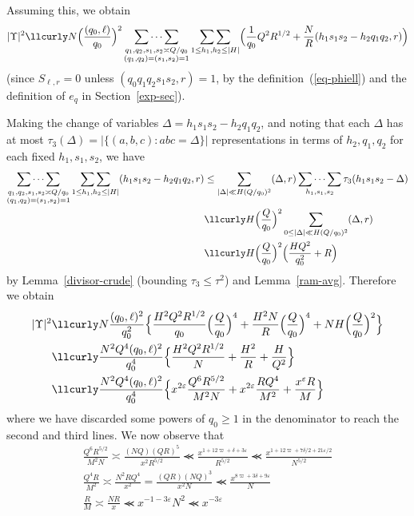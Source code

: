 \documentclass[12pt,a4paper,reqno]{amsart}
\numberwithin{equation}{section}
\theoremstyle{plain}
\theoremstyle{definition}
\newcommand\eps{\varepsilon}
\newcommand\sumsum{\mathop{\sum\sum}\limits}
\newcommand\multsum{\mathop{\sum\cdots\sum}\limits}
\renewcommand{\sim}{\asymp}
\renewcommand{\lessapprox}{\llcurly}
\begin{document}
Assuming this, we obtain
$$
|\Upsilon|^2\lessapprox N\Bigl(\frac{(q_0,\ell)}{q_0}\Bigr)^2
\multsum_{\substack{q_1,q_2,s_1,s_2\sim Q/q_0\\
    (q_1,q_2)=(s_1,s_2)=1 }} \sumsum_{1\leq h_1,h_2\leq |H|}
\Bigl(\frac{1}{q_0}Q^2 R^{1/2} +
\frac{N}{R}(h_1s_1s_2-h_2q_1q_2,r)\Bigr)
$$
(since $S_{\ell,r}=0$ unless $(q_0q_1q_2s_1s_2,r)=1$, by the
definition~(\ref{eq-phiell}) and the definition of $e_q$ in
Section~\ref{exp-sec}).
\par
Making the change of variables $\Delta = h_1 s_1 s_2 - h_2 q_1 q_2$, and noting that each $\Delta$ has at most $\tau_3(\Delta) = |\{ (a,b,c): abc = \Delta \}|$ representations in terms of $h_2,q_1,q_2$ for each fixed $h_1,s_1,s_2$, we have
\begin{align*}
  \multsum_{\substack{q_1,q_2,s_1,s_2\sim Q/q_0\\
      (q_1,q_2)=(s_1,s_2)=1 }} \sumsum_{1\leq h_1,h_2\leq |H|}
  (h_1s_1s_2-h_2q_1q_2,r) &\leq \sum_{|\Delta|\ll
    H(Q/q_0)^2}(\Delta,r) \multsum_{h_1,s_1,s_2}
  \tau_3(h_1s_1s_2-\Delta)\\
  &\lessapprox H\Bigl(\frac{Q}{q_0}\Bigr)^2\sum_{0\leq |\Delta|\ll
    H(Q/q_0)^2}(\Delta,r)\\
&\lessapprox H\Bigl(\frac{Q}{q_0}\Bigr)^2\Bigl(\frac{HQ^2}{q_0^2}+R\Bigr)
\end{align*}
by Lemma~\ref{divisor-crude} (bounding $\tau_3 \leq \tau^2$) and
Lemma~\ref{ram-avg}. Therefore we obtain
\begin{align}
  |\Upsilon|^2&\lessapprox N\frac{(q_0,\ell)^2}{q_0^2}\Bigl\{
  \frac{H^2Q^2R^{1/2}}{q_0}\Bigl(\frac{Q}{q_0}\Bigr)^4
  +\frac{H^2N}{R}\Bigl(\frac{Q}{q_0}\Bigr)^4+
  NH\Bigl(\frac{Q}{q_0}\Bigr)^2
  \Bigr\}\nonumber\\
  &\lessapprox \frac{N^2Q^4(q_0,\ell)^2}{q_0^4} \Bigl\{
  \frac{H^2Q^2R^{1/2}}{N}+\frac{H^2}{R}+\frac{H}{Q^2} \Bigr\}
  \nonumber\\
  &\lessapprox \frac{N^2Q^4(q_0,\ell)^2}{q_0^4} \Bigl\{
  x^{2\eps}\frac{Q^6R^{5/2}}{M^2N}+x^{2\eps}\frac{RQ^4}{M^2}+\frac{x^{\eps}R}{M}
  \Bigr\}
\label{eq-iv-final}
\end{align}
where we have discarded some powers of $q_0 \geq 1$ in the denominator to reach the second and third lines.
We now observe that
\begin{gather*}
  \frac{Q^6R^{5/2}}{M^2N} \sim \frac{(NQ)(QR)^5}{x^2R^{5/2}}
  \lessapprox \frac{x^{1+12\varpi+\delta+3\eps}}{R^{5/2}} \lessapprox
  \frac{x^{1+12\varpi+7\delta/2+21\eps/2}}{N^{5/2}}
  \\
  \frac{Q^4R}{M^2}\sim \frac{N^2RQ^4}{x^2}=\frac{(QR)(NQ)^3}{x^2N}
  \lessapprox \frac{x^{8\varpi +3\delta+9\eps}}{N}
  \\
  \frac{R}{M}\sim \frac{NR}{x}\lessapprox x^{-1-3\eps}N^2\lessapprox
  x^{-3\eps}
\end{gather*}
\end{document}
